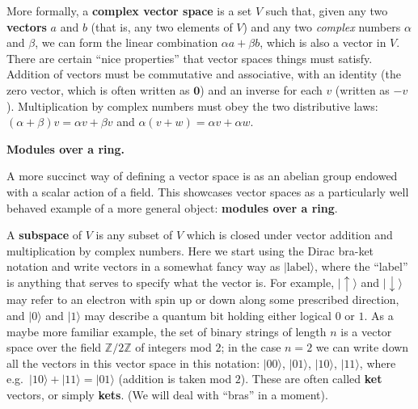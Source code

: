 \documentclass[fleqn,a4paper]{article}
\newenvironment{technical}[1]{\textbf{#1.}\par\vspace{.5\baselineskip}\everypar{\setlength{\parindent}{1.5em}}}{}
\theoremstyle{definition}
\theoremstyle{definition}
\theoremstyle{definition}
\theoremstyle{definition}
\theoremstyle{remark}
\begin{document}
More formally, a \textbf{complex vector space} is a set \(V\) such that, given any two \textbf{vectors} \(a\) and \(b\) (that is, any two elements of \(V\)) and any two \emph{complex} numbers \(\alpha\) and \(\beta\), we can form the linear combination \(\alpha a+\beta b\), which is also a vector in \(V\).
There are certain ``nice properties'' that vector spaces things must satisfy. Addition of vectors must be commutative and associative, with an identity (the zero vector, which is often written as \(\mathbf{0}\)) and an inverse for each \(v\) (written as \(-v\)). Multiplication by complex numbers must obey the two distributive laws: \((\alpha+\beta)v = \alpha v+\beta v\) and \(\alpha (v+w) = \alpha v+\alpha w\).

\begin{technical}{Modules over a ring}
A more succinct way of defining a vector space is as an abelian group endowed with a scalar action of a field.
This showcases vector spaces as a particularly well behaved example of a more general object: \textbf{modules over a ring}.

\end{technical}

A \textbf{subspace} of \(V\) is any subset of \(V\) which is closed under vector addition and multiplication by complex numbers.
Here we start using the Dirac bra-ket notation and write vectors in a somewhat fancy way as \(|\text{label}\rangle\), where the ``label'' is anything that serves to specify what the vector is.
For example, \(|\uparrow\rangle\) and \(|\downarrow\rangle\) may refer to an electron with spin up or down along some prescribed direction, and \(|0\rangle\) and \(|1\rangle\) may describe a quantum bit holding either logical \(0\) or \(1\).
As a maybe more familiar example, the set of binary strings of length \(n\) is a vector space over the field \(\mathbb{Z}/2\mathbb{Z}\) of integers mod \(2\); in the case \(n=2\) we can write down all the vectors in this vector space in this notation: \(|00\rangle\), \(|01\rangle\), \(|10\rangle\), \(|11\rangle\), where e.g.~\(|10\rangle+|11\rangle=|01\rangle\) (addition is taken mod \(2\)).
These are often called \textbf{ket} vectors, or simply \textbf{kets}.
(We will deal with ``bras'' in a moment).
\end{document}
